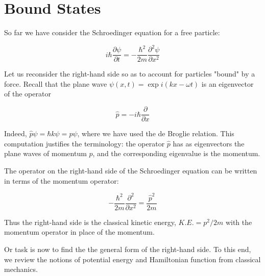 
\begin{mathmacro}
\newcommand{\bop}[0]{\bf{p}}
\newcommand{\boF}[0]{\bf{F}}
\newcommand{\bor}[0]{\bf{r}}
\newcommand{\bov}[0]{\bf{v}}
\end{mathmacro}

\setcounter{section}{4}


\section{Bound States}


So far we have consider the Schroedinger equation for a free particle:

\begin{equation}
  i\hbar \frac{\partial \psi}{\partial t}
    =
  -\frac{ \hbar^2 }{2m}\frac{ \partial^2 \psi}{ \partial x^2 }
\end{equation}

Let us reconsider the right-hand side so as to account for particles "bound" by a force.  Recall that the plane wave $\psi(x,t) = \exp i(kx - \omega t)$  is an eigenvector of the operator

\begin{equation}
  \hat p = -i\hbar \frac{\partial}{\partial x}
\end{equation}

Indeed, $\hat p \psi = \hbar  k\psi = p\psi$, where we have used the de Broglie relation.  This computation justifies the terminology: the operator $\hat p$ has as eigenvectors the plane waves of momentum $p$, and the corresponding eigenvalue is the momentum.


The operator on the right-hand side of the Schroedinger equation can be written in terms of the momentum operator:

\begin{equation}
    -\frac{ \hbar^2 }{2m}\frac{ \partial^2 }{ \partial x^2 }
 = \frac{\hat p^2}{2m}
\end{equation}

Thus the right-hand side is the classical kinetic energy, $K.E. = p^2/2m$ with the momentum operator in place of the momentum.

Or task is now to find the the general form of the right-hand side. To this end, we review the notions of potential energy and Hamiltonian function from classical mechanics.

